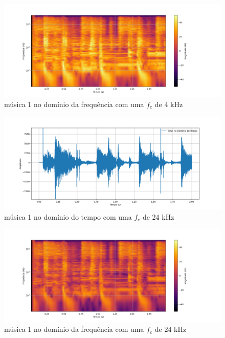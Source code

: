 \begin{anexosenv}
\begin{figure}[h]
	\centering
    \includegraphics[width=\textwidth]{figuras/fig29.png}
	\caption{música 1 no domínio da frequência com uma $f_c$ de 4 kHz}
	\label{fig29}
\end{figure}

\begin{figure}[h]
	\centering
    \includegraphics[width=\textwidth]{figuras/fig30.png}
	\caption{música 1 no domínio do tempo com uma $f_c$ de 24 kHz}
	\label{fig30}
\end{figure}

\begin{figure}[h]
	\centering
    \includegraphics[width=\textwidth]{figuras/fig31.png}
	\caption{música 1 no domínio da frequência com uma $f_c$ de 24 kHz}
	\label{fig31}
\end{figure}


\end{anexosenv}

